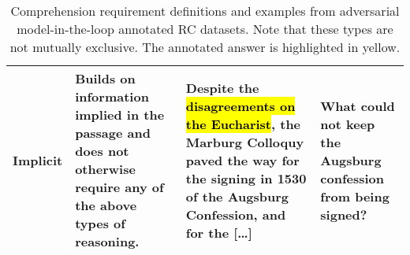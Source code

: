 \documentclass[11pt,a4paper]{article}
\DeclareRobustCommand{\hlcustom}[1]{{\sethlcolor{mycol}\hl{#1}}}
\begin{document}
\begin{table*}[ht]
\begin{center}
\begin{tabular}{p{}p{}p{}p{}}
    \hline
    Implicit & Builds on information implied in the passage and does not otherwise require any of the above types of reasoning. & Despite the \hlcustom{disagreements on the Eucharist}, the Marburg Colloquy paved the way for the signing in 1530 of the Augsburg Confession, and for the [\ldots]  & What could not keep the Augsburg confession from being signed? \\
    \bottomrule
    
    \end{tabular}
    \end{center}
    \caption{\label{tab:reasoning_types} Comprehension requirement definitions and examples from adversarial model-in-the-loop annotated RC datasets. Note that these types are not mutually exclusive. The annotated answer is highlighted in yellow.}
    \end{table*}
\fi
\end{document}
